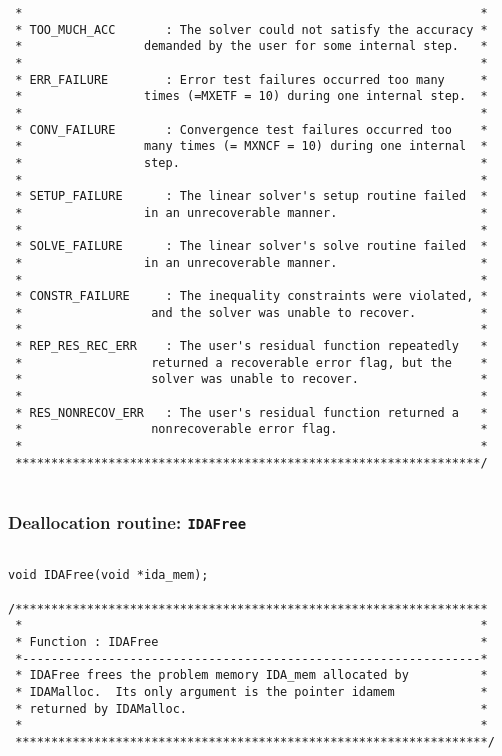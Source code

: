 \documentclass[11pt]{article}
\begin{document}
\begin{verbatim}
 *                                                                *
 * TOO_MUCH_ACC       : The solver could not satisfy the accuracy *
 *                 demanded by the user for some internal step.   *
 *                                                                *
 * ERR_FAILURE        : Error test failures occurred too many     *
 *                 times (=MXETF = 10) during one internal step.  *
 *                                                                *
 * CONV_FAILURE       : Convergence test failures occurred too    *
 *                 many times (= MXNCF = 10) during one internal  * 
 *                 step.                                          *
 *                                                                *
 * SETUP_FAILURE      : The linear solver's setup routine failed  *
 *                 in an unrecoverable manner.                    *
 *                                                                *
 * SOLVE_FAILURE      : The linear solver's solve routine failed  *
 *                 in an unrecoverable manner.                    *
 *                                                                *
 * CONSTR_FAILURE     : The inequality constraints were violated, *
 *                  and the solver was unable to recover.         *
 *                                                                *
 * REP_RES_REC_ERR    : The user's residual function repeatedly   *
 *                  returned a recoverable error flag, but the    *
 *                  solver was unable to recover.                 *
 *                                                                *
 * RES_NONRECOV_ERR   : The user's residual function returned a   *
 *                  nonrecoverable error flag.                    *
 *                                                                *
 *****************************************************************/
 
\end{verbatim}
\normalsize



\subsubsection{Deallocation routine: {\tt IDAFree}}

\small
\begin{verbatim}

void IDAFree(void *ida_mem);

/******************************************************************
 *                                                                *
 * Function : IDAFree                                             *
 *----------------------------------------------------------------*
 * IDAFree frees the problem memory IDA_mem allocated by          *
 * IDAMalloc.  Its only argument is the pointer idamem            *
 * returned by IDAMalloc.                                         *
 *                                                                *
 ******************************************************************/

\end{verbatim}
\normalsize 
\end{document}
